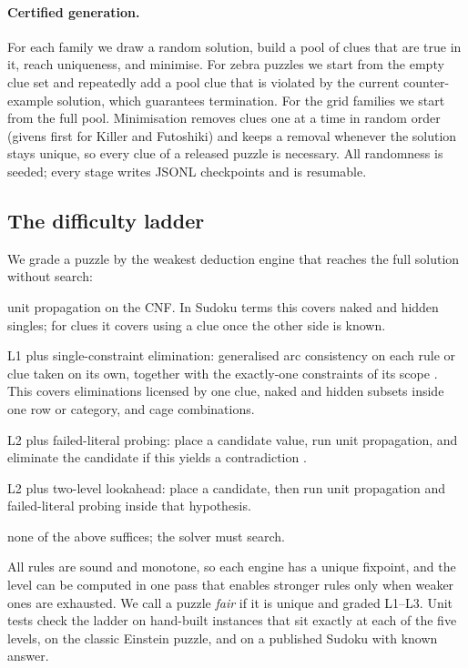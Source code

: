 \paragraph{Certified generation.} For each family we draw a random solution, build a pool of clues that are true in it, reach uniqueness, and minimise. For zebra puzzles we start from the empty clue set and repeatedly add a pool clue that is violated by the current counter-example solution, which guarantees termination. For the grid families we start from the full pool. Minimisation removes clues one at a time in random order (givens first for Killer and Futoshiki) and keeps a removal whenever the solution stays unique, so every clue of a released puzzle is necessary. All randomness is seeded; every stage writes JSONL checkpoints and is resumable.

\subsection{The difficulty ladder}
\label{sec:ladder}

We grade a puzzle by the weakest deduction engine that reaches the full solution without search:
\begin{description}[leftmargin=1.4em,itemsep=1pt,topsep=2pt]
\item[L1] unit propagation on the CNF. In Sudoku terms this covers naked and hidden singles; for clues it covers using a clue once the other side is known.
\item[L2] L1 plus single-constraint elimination: generalised arc consistency on each rule or clue taken on its own, together with the exactly-one constraints of its scope \citep{mackworth1977consistency,regin1994alldiff}. This covers eliminations licensed by one clue, naked and hidden subsets inside one row or category, and cage combinations.
\item[L3] L2 plus failed-literal probing: place a candidate value, run unit propagation, and eliminate the candidate if this yields a contradiction \citep{li1997lookahead,heule2009lookahead}.
\item[L4] L2 plus two-level lookahead: place a candidate, then run unit propagation and failed-literal probing inside that hypothesis.
\item[L5] none of the above suffices; the solver must search.
\end{description}
All rules are sound and monotone, so each engine has a unique fixpoint, and the level can be computed in one pass that enables stronger rules only when weaker ones are exhausted. We call a puzzle \emph{fair} if it is unique and graded L1--L3. Unit tests check the ladder on hand-built instances that sit exactly at each of the five levels, on the classic Einstein puzzle, and on a published Sudoku with known answer.

